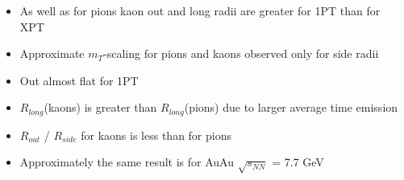 \documentclass[dvipsnames] {beamer}
\begin{document}
\begin{frame}
\begin{columns}[t]
\begin{block}{}
            \bf
            \begin{itemize}
            \item \scriptsize As well as for pions kaon out and long radii are greater for 1PT than for XPT
            \item Approximate $m_{T}$-scaling for pions and kaons observed only for side radii
            \item Out almost flat for 1PT
            \item $R_{long}$(kaons) is greater than $R_{long}$(pions) due to larger average time emission
            \item $R_{out}$ / $R_{side}$ for kaons is less than for pions
            \item Approximately the same result is for AuAu $\sqrt{s_{NN}}$ = 7.7 GeV
            \end{itemize}
          \end{block}         
        \end{columns}
      \end{frame}
\end{document}
